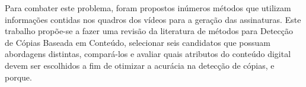 Para combater este problema, foram propostos inúmeros métodos que utilizam informações contidas nos quadros dos vídeos para a geração das assinaturas. Este trabalho propõe-se a fazer uma revisão da literatura de métodos para Detecção de Cópias Baseada em Conteúdo, selecionar seis candidatos que possuam abordagens distintas, compará-los e avaliar quais atributos do conteúdo digital devem ser escolhidos a fim de otimizar a acurácia na detecção de cópias, e porque. 


